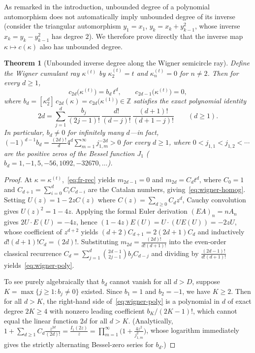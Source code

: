 \documentclass[11pt,a4paper]{article}
\newtheorem{theorem}{Theorem}[section]
\theoremstyle{definition}
\theoremstyle{remark}
\newcommand{\Z}{\mathbb{Z}}
\begin{document}
As remarked in the introduction, unbounded degree of a polynomial automorphism does not automatically imply unbounded degree of its inverse (consider the triangular automorphism $y_1 = x_1$, $y_k = x_k + y_{k-1}^2$, whose inverse $x_k = y_k - y_{k-1}^2$ has degree $2$). We therefore prove directly that the inverse map $\kappa \mapsto c(\kappa)$ also has unbounded degree.

\begin{theorem}[Unbounded inverse degree along the Wigner semicircle ray]\label{thm:wigner-degree}
Define the Wigner cumulant ray $\kappa^{(t)}$ by $\kappa^{(t)}_2 = t$ and $\kappa^{(t)}_n = 0$ for $n \ne 2$. Then for every $d \ge 1$,
\begin{equation}\label{eq:wigner-homog}
  c_{2d}\bigl(\kappa^{(t)}\bigr) = b_d \, t^d, \qquad c_{2d-1}\bigl(\kappa^{(t)}\bigr) = 0,
\end{equation}
where $b_d = [\kappa_2^d]\,c_{2d}(\kappa) = c_{2d}\bigl(\kappa^{(1)}\bigr) \in \Z$ satisfies the exact polynomial identity
\begin{equation}\label{eq:wigner-poly}
  2d = \sum_{j=1}^{d} \frac{b_j}{(2j-1)!}\, \frac{d!}{(d-j)!}\, \frac{(d+1)!}{(d+1-j)!}
  \qquad (d \ge 1).
\end{equation}
In particular, $b_d \ne 0$ for infinitely many $d$---in fact, $(-1)^{d-1} b_d = \frac{(2d)!}{d} 4^d \sum_{m=1}^\infty j_{1,m}^{-2d} > 0$ for every $d \ge 1$, where $0 < j_{1,1} < j_{1,2} < \cdots$ are the positive zeros of the Bessel function $J_1$ ($b_d = 1, -1, 5, -56, 1092, -32670, \dots$).
\end{theorem}

\begin{proof}
At $\kappa = \kappa^{(t)}$,~\eqref{eq:fr-rec} yields $m_{2d-1} = 0$ and $m_{2d} = C_d t^d$, where $C_0 = 1$ and $C_{d+1} = \sum_{i=0}^d C_i C_{d-i}$ are the Catalan numbers, giving~\eqref{eq:wigner-homog}. Setting $U(z) = 1 - 2z C(z)$ where $C(z) = \sum_{d \ge 0} C_d z^d$, Cauchy convolution gives $U(z)^2 = 1 - 4z$. Applying the formal Euler derivation $(E A)_n = n A_n$ gives $2 U \cdot E(U) = -4z$, hence $(1 - 4z) E(U) = U \cdot (U E(U)) = -2z U$, whose coefficient of $z^{d+2}$ yields $(d+2)C_{d+1} = 2(2d+1)C_d$ and inductively $d!(d+1)! C_d = (2d)!$. Substituting $m_{2d} = \frac{(2d)!}{d!(d+1)!}$ into the even-order classical recurrence $C_d = \sum_{j=1}^d \binom{2d-1}{2j-1} b_j C_{d-j}$ and dividing by $\frac{(2d-1)!}{d!(d+1)!}$ yields~\eqref{eq:wigner-poly}.

To see purely algebraically that $b_d$ cannot vanish for all $d > D$, suppose $K = \max\{j \ge 1 : b_j \ne 0\}$ existed. Since $b_1 = 1$ and $b_2 = -1$, we have $K \ge 2$. Then for all $d > K$, the right-hand side of~\eqref{eq:wigner-poly} is a polynomial in $d$ of exact degree $2K \ge 4$ with nonzero leading coefficient $b_K / (2K-1)!$, which cannot equal the linear function $2d$ for all $d > K$. (Analytically, $1 + \sum_{d \ge 1} C_d \frac{z^{2d}}{(2d)!} = \frac{I_1(2z)}{z} = \prod_{m=1}^\infty \bigl(1 + \frac{4z^2}{j_{1,m}^2}\bigr)$, whose logarithm immediately gives the strictly alternating Bessel-zero series for $b_d$.)
\end{proof}
\end{document}

